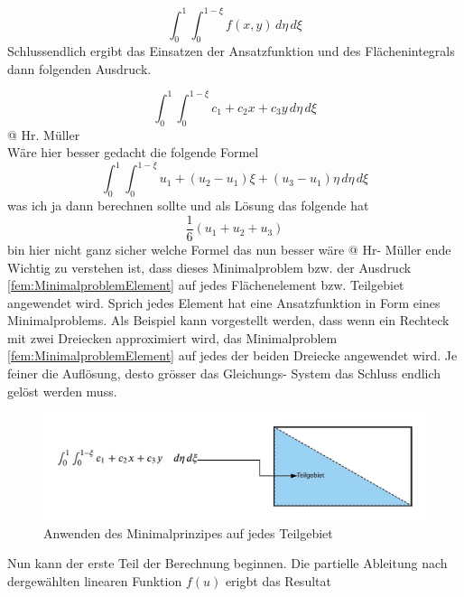 \begin{equation}
\int_0^1 \int_0^{1 - \xi} f(x,y) \, d \eta \, d \xi
\label{fem:FlaecheDreieck}
\end{equation}
Schlussendlich ergibt das Einsatzen der Ansatzfunktion und des Flächenintegrals dann folgenden Ausdruck.

\begin{equation}
\int_0^1 \int_0^{1 - \xi} c_1 + c_2x + c_3y \, d \eta \, d \xi
\label{fem:MinimalproblemElement}
\end{equation}
@ Hr. Müller\\
Wäre hier besser gedacht die folgende Formel
\begin{equation}
\int_0^1 \int_0^{1 - \xi} u_1 + (u_2 - u_1)\xi + (u_3 - u_1)\eta \, d \eta \, d \xi
\label{fem:MinimalproblemElement2}
\end{equation}
was ich ja dann berechnen sollte und als Lösung das folgende hat
\begin{equation}
\frac{1}{6}(u_1 + u_2 + u_3)
\label{fem:MinimalproblemElement3}
\end{equation}
bin hier nicht ganz sicher welche Formel das nun besser wäre
@ Hr- Müller ende\\
Wichtig zu verstehen ist, dass dieses Minimalproblem bzw. der Ausdruck \ref{fem:MinimalproblemElement} auf jedes Flächenelement bzw. Teilgebiet angewendet wird. Sprich jedes Element hat eine Ansatzfunktion in Form eines Minimalproblems. Als Beispiel kann vorgestellt werden, dass wenn ein Rechteck mit zwei Dreiecken approximiert wird, das Minimalproblem \ref{fem:MinimalproblemElement} auf jedes der beiden Dreiecke angewendet wird. Je feiner die Auflösung, desto grösser das Gleichungs- System das Schluss endlich gelöst werden muss.

\begin{figure}[h!]
	\centering
	\includegraphics[scale=0.8]{papers/fem/Images/FoTeilgebiet.jpeg}
	\caption{Anwenden des Minimalprinzipes auf jedes Teilgebiet}
	\label{fig:schemNMR_vorlage}
\end{figure}

Nun kann der erste Teil der Berechnung beginnen. Die partielle Ableitung nach dergewählten linearen Funktion $f(u)$ erigbt das Resultat

